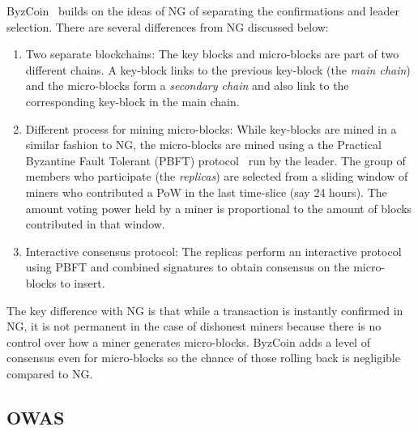 \documentclass[]{report}   %
\begin{document}
ByzCoin~\cite{kokorisposter} builds on the ideas of NG of separating the confirmations and leader selection. There are several differences from NG discussed below:
\begin{enumerate}
	\item Two separate blockchains: The key blocks and micro-blocks are part of two different chains. A key-block links to the previous key-block (the {\em main chain}) and the micro-blocks form a {\em secondary chain} and also link to the corresponding key-block in the main chain. 
	\item Different process for mining micro-blocks: While key-blocks are mined in a similar fashion to NG, the micro-blocks are mined using a the Practical Byzantine Fault Tolerant (PBFT) protocol~\cite{castro1999practical} run by the leader. The group of members who participate (the {\em replicas}) are selected from a sliding window of miners who contributed a PoW in the last time-slice (say 24 hours). The amount voting power held by a miner is proportional to the amount of blocks contributed in that window.
	\item Interactive consensus protocol: The replicas perform an interactive protocol using PBFT and combined signatures to obtain consensus on the micro-blocks to insert.
\end{enumerate}

The key difference with NG is that while a transaction is instantly confirmed in NG, it is not permanent in the case of dishonest miners because there is no control over how a miner generates micro-blocks. ByzCoin adds a level of consensus even for micro-blocks so the chance of those rolling back is negligible compared to NG.

\subsection{OWAS}
\end{document}

